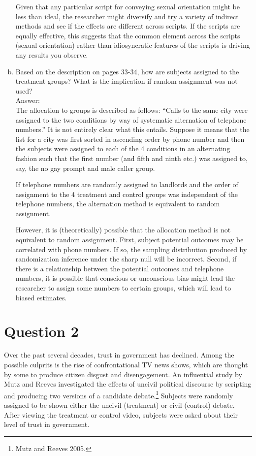 \documentclass[11pt,notitlepage]{article}\usepackage[]{graphicx}\usepackage[]{color}
\begin{document}
\begin{enumerate}[a)]
Given that any particular script for conveying sexual orientation might be less than ideal, the researcher might diversify and try a variety of indirect methods and see if the effects are different across scripts. If the scripts are equally effective, this suggests that the common element across the scripts (sexual orientation) rather than idiosyncratic features of the scripts is driving any results you observe.  

\item Based on the description on pages 33-34, how are subjects assigned to the treatment groups? What is the implication if random assignment was not used?\\
Answer:\\
The allocation to groups is described as follows: ``Calls to the same city were assigned to the two conditions by way of systematic alternation of telephone numbers.'' It is not entirely clear what this entails. Suppose it means that the list for a city was first sorted in ascending order by phone number and then the subjects were assigned to each of the 4 conditions in an alternating fashion such that the first number (and fifth and ninth etc.) was assigned to, say, the no gay prompt and male caller group. 

If telephone numbers are randomly assigned to landlords and the order of assignment to the 4 treatment and control groups was independent of the telephone numbers, the alternation method is equivalent to random assignment. 

However, it is (theoretically) possible that the allocation method is not equivalent to random assignment. First, subject potential outcomes may be correlated with phone numbers.  If so, the sampling distribution produced by randomization inference under the sharp null will be incorrect. Second, if there is a relationship between the potential outcomes and telephone numbers, it is possible that conscious or unconscious bias might lead the researcher to assign some  numbers to certain groups, which will lead to biased estimates. 

\end{enumerate}

\section*{Question 2}
Over the past several decades, trust in government has declined. Among the possible culprits is the rise of confrontational TV news shows, which are thought by some to produce citizen disgust and disengagement. An influential study by Mutz and Reeves investigated the effects of uncivil political discourse by scripting and producing two versions of a candidate debate.\footnote{Mutz and Reeves 2005.} Subjects were randomly assigned to be shown either the uncivil (treatment) or civil (control) debate. After viewing the treatment or control video, subjects were asked about their level of trust in government.
\end{document}
